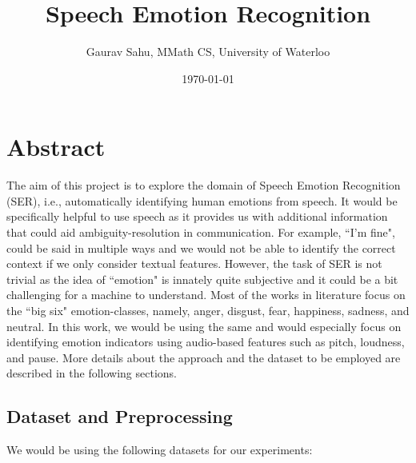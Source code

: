 \documentclass[11pt,a4paper]{article}
\title{\textbf{Speech Emotion Recognition}}
\author{Gaurav Sahu, MMath CS, University of Waterloo}
\date{\today}
\begin{document}
\maketitle
\section*{Abstract}

The aim of this project is to explore the domain of Speech Emotion Recognition (SER), i.e., automatically identifying human emotions from speech. It would be specifically helpful to use speech as it provides us with additional information that could aid ambiguity-resolution in communication. For example, ``I'm fine", could be said in multiple ways and we would not be able to identify the correct context if we only consider textual features. However, the task of SER is not trivial as the idea of ``emotion" is innately quite subjective and it could be a bit challenging for a machine to understand. Most of the works in literature focus on the ``big six" emotion-classes, namely, anger, disgust, fear, happiness, sadness, and neutral. In this work, we would be using the same and would especially focus on identifying emotion indicators using audio-based features such as pitch, loudness, and pause. More details about the approach and the dataset to be employed are described in the following sections.


\subsection*{Dataset and Preprocessing}
We would be using the following datasets for our experiments:
\end{document}
